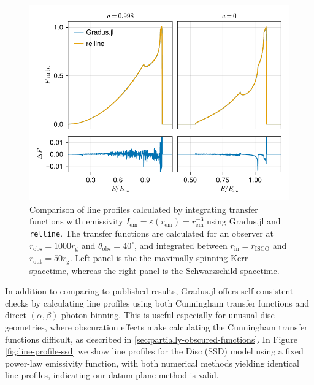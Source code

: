 \documentclass[fleqn,usenatbib]{mnras}
\newcommand{\Gradus}{Gradus.jl\xspace}
\newcommand{\relline}{\texttt{relline}\xspace}
\newcommand{\rg}{r_\text{g}}
\newcommand{\risco}{r_\text{ISCO}}
\begin{document}
\begin{figure}
	\centering
	\includegraphics[width=0.99\linewidth]{figures/lineprofiles.comparison.pdf}
	\caption{Comparison of line profiles calculated by integrating transfer functions with emissivity $I_\text{em} = \varepsilon(r_\text{em}) = r_\text{em}^{-3}$ using \Gradus and \relline. The transfer functions are calculated for an observer at $r_\text{obs} = 1000\rg$ and $\theta_\text{obs} = 40^\circ$, and integrated between $r_\text{in} = \risco$ and $r_\text{out} = 50 \rg$. Left panel is the the maximally spinning Kerr spacetime, whereas the right panel is the Schwarzschild spacetime.}
	\label{fig:relline-comparison}
\end{figure}

In addition to comparing to published results, \Gradus offers self-consistent
checks by calculating line profiles using both Cunningham transfer functions and
direct $(\alpha, \beta)$ photon binning. This is useful especially for unusual
disc geometries, where obscuration effects make calculating the Cunningham
transfer functions difficult, as described in
\ref{sec:partially-obscured-functions}. In Figure \ref{fig:line-profile-ssd} we
show line profiles for the \citet{shakura_black_1973} Disc (SSD) model using a fixed power-law emissivity
function, with both numerical methods yielding identical line profiles,
indicating our datum plane method is valid.
\end{document}
